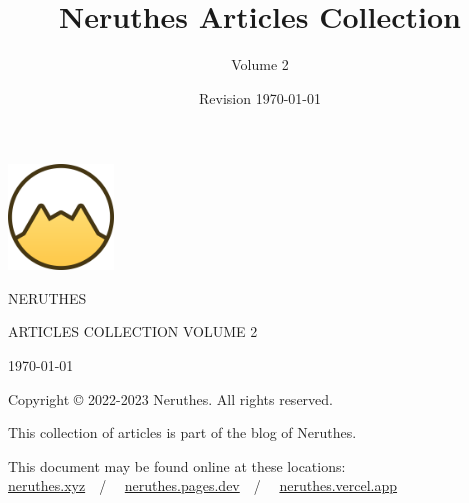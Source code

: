 \documentclass[12pt,a4paper]{report}
\title{Neruthes Articles Collection}
\author{Volume 2}
\date{Revision \today}
\begin{document}
\begin{titlepage}
	\center
	\ttfamily
	\leavevmode
	\vskip 90pt
	\includegraphics[width=28mm]{wwwsrc/neruthes-forceCircle-unpadded.png}\par
	\vskip 50pt
		{\fontsize{24pt}{24pt}\selectfont\MakeUppercase{NERUTHES}}\par\vskip 30pt
		{\normalsize\MakeUppercase{Articles Collection Volume 2}}\par
	\vfill
	\small
	\today\par
\end{titlepage}
\pagestyle{plain}
\tableofcontents\clearpage





\rmfamily








\clearpage\pagestyle{empty}
\leavevmode\vfill
\footnotesize\sffamily
Copyright \copyright{} 2022-2023 Neruthes. All rights reserved.\par
This collection of articles is part of the blog of Neruthes.\par
This document may be found online at these locations:\\
\href{https://neruthes.xyz/articles/Neruthes_articles_vol002.pdf}{neruthes.xyz}~~/~~%
\href{https://neruthes.pages.dev/articles/Neruthes_articles_vol002.pdf}{neruthes.pages.dev}~~/~~%
\href{https://neruthes.vercel.app/articles/Neruthes_articles_vol002.pdf}{neruthes.vercel.app}
\end{document}
